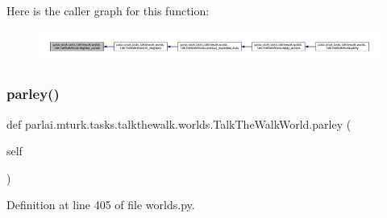 Here is the caller graph for this function\+:
\nopagebreak
\begin{figure}[H]
\begin{center}
\leavevmode
\includegraphics[width=350pt]{classparlai_1_1mturk_1_1tasks_1_1talkthewalk_1_1worlds_1_1TalkTheWalkWorld_ae4bf42eec01e7f4d6e37fd2e9c55e4b0_icgraph}
\end{center}
\end{figure}
\mbox{\label{classparlai_1_1mturk_1_1tasks_1_1talkthewalk_1_1worlds_1_1TalkTheWalkWorld_a9e6fdd57358e381a4b47163eb6176569}} 
\subsubsection{\texorpdfstring{parley()}{parley()}}
{\footnotesize\ttfamily def parlai.\+mturk.\+tasks.\+talkthewalk.\+worlds.\+Talk\+The\+Walk\+World.\+parley (\begin{DoxyParamCaption}\item[{}]{self }\end{DoxyParamCaption})}



Definition at line 405 of file worlds.\+py.



